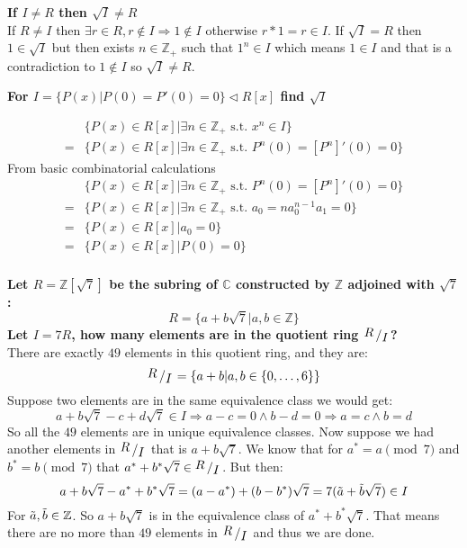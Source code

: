 \documentclass{article}
\theoremstyle{plain}
\DeclareMathOperator{\idealin}{\triangleleft}
\newcommand{\Z}{\mathbb{Z}}
\newcommand{\C}{\mathbb{C}}
\newcommand{\bigslant}[2]
{{\raisebox{.2em}{$#1$}\left/\raisebox{-.2em}{$#2$}\right.}}
\begin{document}
	\textbf{If $I \neq R$ then $\sqrt{I} \neq R$} \\
	If $R\neq I$ then $\exists r\in R,r\notin I \Rightarrow 1\notin I$ 
	otherwise $r*1=r\in I$. If $\sqrt{I}=R$ then $1\in\sqrt{I}$ but then 
	exists $n\in\Z_+$ such that $1^n\in I$ which means $1\in I$ and that is a 
	contradiction to $1\notin I$ so $\sqrt{I}\neq R$.
	
	\newpage
	
	\textbf{For $I = \{P(x) \vert P(0)=P'(0)=0\} \idealin R[x]$ find 
	$\sqrt{I}$} 

	\begin{align*}
		&\{P(x)\in R[x] \vert \exists n\in\Z_+ \text{ s.t. } x^n\in I\} \\
		=&\{P(x)\in R[x] \vert \exists n\in\Z_+ \text{ s.t. } 
		P^n(0) = [P^n]'(0) = 0\}
	\end{align*}
	From basic combinatorial calculations
	\begin{align*}
		&\{P(x)\in R[x] \vert \exists n\in\Z_+ \text{ s.t. } 
		P^n(0) = [P^n]'(0) = 0\} \\
		=&\{P(x)\in R[x] \vert \exists n\in\Z_+ \text{ s.t. } 
		a_0 = na_0^{n-1}a_1 = 0\} \\
		=&\{P(x)\in R[x] \vert a_0 = 0\} \\
		=&\{P(x)\in R[x] \vert P(0) = 0\} \\
	\end{align*}
	
	\newpage
	
	\textbf{
	Let $R = \Z[\sqrt{7}]$ be the subring of $\C$ constructed by $\Z$ adjoined
	with $\sqrt{7}$:
	\[
		R = \{a + b\sqrt{7} \vert a,b\in\Z \}
	\]
	Let $I = 7R$, how many elements are in the quotient ring 
	$\bigslant{R}{I}$?} \\
    There are exactly $49$ elements in this quotient ring, and
    they are:
    \[
        \bigslant{R}{I} = \{a+b \vert a,b\in\{0,\dots,6\}\}
    \]
    Suppose two elements are in the same equivalence class we would
    get:
    \[
    a+b\sqrt{7} - c+d\sqrt{7} \in I \Rightarrow
    a-c = 0 \land b-d = 0 \Rightarrow
    a = c \land b = d
    \]
    So all the $49$ elements are in unique equivalence classes.
    Now suppose we had another elements in $\bigslant{R}{I}$
    that is $a+b\sqrt{7}$. We know that for $a^\ast = a\pmod{7}$
    and $b^\ast = b\pmod{7}$ that $a^\ast+b^\ast\sqrt{7} \in \bigslant{R}
    {I}$. But then:
    \[
    a+b\sqrt{7} - a^\ast+b^\ast\sqrt{7} = 
    (a-a^\ast)+(b-b^\ast)\sqrt{7} = 7(\Tilde{a}+\Tilde{b}\sqrt{7})
    \in I
    \]
    For $\Tilde{a},\Tilde{b}\in \Z$. So $a+b\sqrt{7}$ is in the
    equivalence class of $a^\ast+b^\ast\sqrt{7}$. That means there
    are no more than $49$ elements in $\bigslant{R}{I}$ and thus we are done.
    
\end{document}
